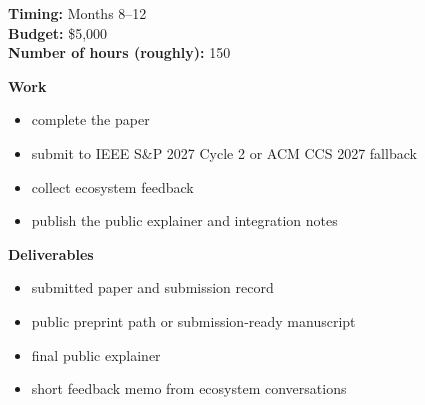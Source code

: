 \documentclass[11pt]{article}
\begin{document}
\textbf{Timing:} Months 8--12\\
\textbf{Budget:} \$5{,}000\\
\textbf{Number of hours (roughly):} 150

\textbf{Work}
\begin{itemize}[leftmargin=*,nosep]
\item complete the paper
\item submit to IEEE S\&P 2027 Cycle 2 or ACM CCS 2027 fallback
\item collect ecosystem feedback
\item publish the public explainer and integration notes
\end{itemize}

\textbf{Deliverables}
\begin{itemize}[leftmargin=*,nosep]
\item submitted paper and submission record
\item public preprint path or submission-ready manuscript
\item final public explainer
\item short feedback memo from ecosystem conversations
\end{itemize}
\end{document}
